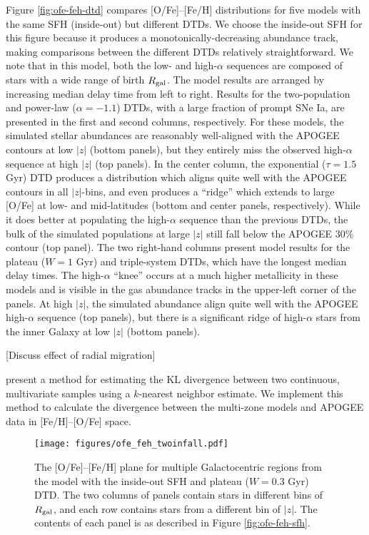 \documentclass[twocolumn,twocolappendix,linenumbers,trackchanges]{aastex631}
\begin{document}
Figure \ref{fig:ofe-feh-dtd} compares [O/Fe]--[Fe/H] distributions for five models with the same SFH (inside-out) but different DTDs. We choose the inside-out SFH for this figure because it produces a monotonically-decreasing abundance track, making comparisons between the different DTDs relatively straightforward. We note that in this model, both the low- and high-$\alpha$ sequences are composed of stars with a wide range of birth $R_{\rm gal}$. The model results are arranged by increasing median delay time from left to right. Results for the two-population and power-law ($\alpha=-1.1$) DTDs, with a large fraction of prompt SNe Ia, are presented in the first and second columns, respectively. For these models, the simulated stellar abundances are reasonably well-aligned with the APOGEE contours at low $|z|$ (bottom panels), but they entirely miss the observed high-$\alpha$ sequence at high $|z|$ (top panels). In the center column, the exponential ($\tau=1.5$ Gyr) DTD produces a distribution which aligns quite well with the APOGEE contours in all $|z|$-bins, and even produces a ``ridge'' which extends to large [O/Fe] at low- and mid-latitudes (bottom and center panels, respectively). While it does better at populating the high-$\alpha$ sequence than the previous DTDs, the bulk of the simulated populations at large $|z|$ still fall below the APOGEE 30\% contour (top panel). The two right-hand columns present model results for the plateau ($W=1$ Gyr) and triple-system DTDs, which have the longest median delay times. The high-$\alpha$ ``knee'' occurs at a much higher metallicity in these models and is visible in the gas abundance tracks in the upper-left corner of the panels. At high $|z|$, the simulated abundance align quite well with the APOGEE high-$\alpha$ sequence (top panels), but there is a significant ridge of high-$\alpha$ stars from the inner Galaxy at low $|z|$ (bottom panels).

[Discuss effect of radial migration]

\citet{PerezCruz2008-KLTest2D} present a method for estimating the KL divergence between two continuous, multivariate samples using a $k$-nearest neighbor estimate. We implement this method to calculate the divergence between the multi-zone models and APOGEE data in [Fe/H]--[O/Fe] space.

\begin{figure}
    \centering
    \texttt{[image: figures/ofe\_feh\_twoinfall.pdf]}
    \caption{The [O/Fe]--[Fe/H] plane for multiple Galactocentric regions from the model with the inside-out SFH and plateau ($W=0.3$ Gyr) DTD. The two columns of panels contain stars in different bins of $R_{\rm gal}$, and each row contains stars from a different bin of $|z|$. The contents of each panel is as described in Figure \ref{fig:ofe-feh-sfh}.}
    \label{fig:ofe-feh-twoinfall}
\end{figure}
\end{document}
